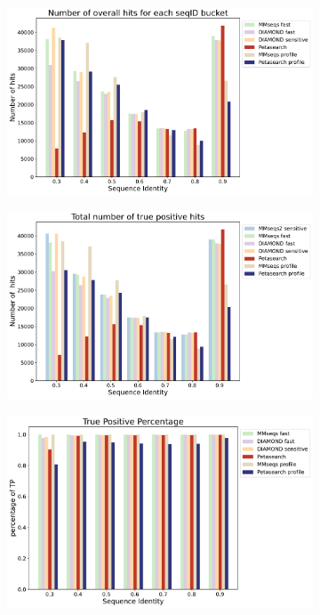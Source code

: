 \begin{figpage}
  \captionsetup[figure]{width=.8\linewidth}
  \begin{figure}
    \begin{subfigure}{0.5\textwidth}
      \centering
      \includegraphics[width=\textwidth]{images/overallHits.pdf}
    \end{subfigure}
    \begin{subfigure}{0.5\textwidth}
      \centering
      \includegraphics[width=\textwidth]{images/totalTP.pdf}
    \end{subfigure}
    \begin{subfigure}{0.5\textwidth}
      \includegraphics[width=\textwidth]{images/percTP.pdf}

\end{subfigure}
\end{figure}
\end{figpage}
